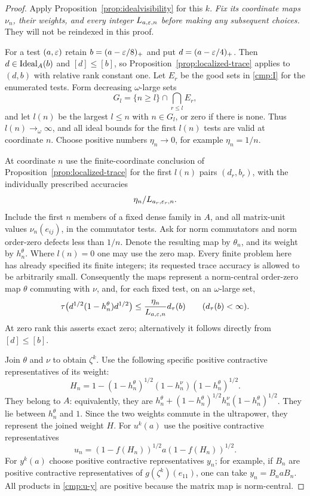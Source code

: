 \begin{proof}
Apply Proposition~\ref{prop:idealvisibility} for this $k$.
\emph{Fix its coordinate maps $\nu_n$, their weights, and every
integer $L_{a,\varepsilon,n}$ before making any subsequent choices.}
They will not be reindexed in this proof.

For a test $(a,\varepsilon)$ retain $b=(a-\varepsilon/8)_+$ and put
$d=(a-\varepsilon/4)_+$.  Then $d\in\operatorname{Ideal}_A(b)$ and
$[d]\le[b]$, so Proposition~\ref{prop:localized-trace} applies to
$(d,b)$ with relative rank constant one.  Let $E_r$ be the good
sets in \eqref{cmp:I} for the enumerated tests.  Form decreasing
$\omega$-large sets
\[
 G_l=\{n\ge l\}\cap\bigcap_{r\le l}E_r,
\]
and let $l(n)$ be the largest $l\le n$ with $n\in G_l$, or zero
if there is none.  Thus $l(n)\to_\omega\infty$, and all ideal
bounds for the first $l(n)$ tests are valid at coordinate $n$.
Choose positive numbers $\eta_n\to0$, for example $\eta_n=1/n$.

At coordinate $n$ use the finite-coordinate conclusion of
Proposition~\ref{prop:localized-trace} for the first $l(n)$ pairs
$(d_r,b_r)$, with the individually prescribed accuracies
\[
 \eta_n/L_{a_r,\varepsilon_r,n}.
\]
Include the first $n$ members of a fixed dense family in $A$, and
all matrix-unit values $\nu_n(e_{ij})$, in the commutator tests.
Ask for norm commutators and norm order-zero defects less than
$1/n$.  Denote the resulting \cpc map by $\theta_n$, and its weight
by $h_n^\theta$.  Where $l(n)=0$ one may use the zero map.  Every
finite problem here has already specified its finite integers;
its requested trace accuracy is allowed to be arbitrarily small.
Consequently the maps represent a norm-central order-zero map
$\theta$ commuting with $\nu$, and, for each fixed test, on an
$\omega$-large set,
\begin{equation}\label{cmp:adaptive-trace}
 \tau\bigl(d^{1/2}(1-h_n^\theta)d^{1/2}\bigr)
 \le\frac{\eta_n}{L_{a,\varepsilon,n}}d_\tau(b)
       \qquad(d_\tau(b)<\infty).
\end{equation}
At zero rank this asserts exact zero; alternatively it follows
directly from $[d]\le[b]$.

Join $\theta$ and $\nu$ to obtain $\zeta^k$.  Use the following
specific positive contractive representatives of its weight:
\begin{equation}\label{cmp:positive-weight-lift}
 H_n=1-(1-h_n^\theta)^{1/2}(1-h_n^\nu)
                         (1-h_n^\theta)^{1/2}.
\end{equation}
They belong to $A$: equivalently, they are
$h_n^\theta+(1-h_n^\theta)^{1/2}h_n^\nu(1-h_n^\theta)^{1/2}$.
They lie between $h_n^\theta$ and $1$.  Since the two weights
commute in the ultrapower, they represent the joined weight $H$.
For $u^k(a)$ use the positive contractive representatives
\begin{equation}\label{cmp:source-lift}
 u_n=(1-f(H_n))^{1/2}a(1-f(H_n))^{1/2}.
\end{equation}
For $y^k(a)$ choose positive contractive representatives $y_n$;
for example, if $B_n$ are positive contractive representatives of
$g(\zeta^k)(e_{11})$, one can take $y_n=B_naB_n$.
All products in \eqref{cmp:u-y} are positive because the matrix
map is norm-central.


\end{proof}
